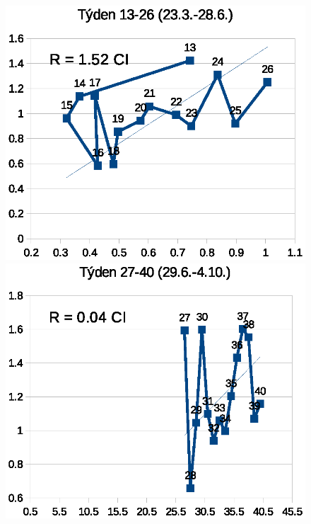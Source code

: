 \begin{figure}
\begin{center}
\includegraphics[scale=0.35]{pic/g1}\includegraphics[scale=0.35]{pic/g2}
\\

\end{center}
\end{figure}
